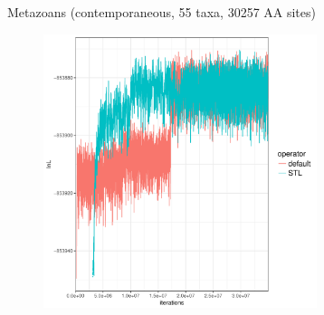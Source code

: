 \documentclass[newPxFont,numfooter,sectionpages]{beamer}
\begin{document}
\begin{frame}{Metazoans (contemporaneous, 55 taxa, 30257 AA sites)}
\begin{figure}
	\includegraphics[width=\textwidth,height=8cm]{figures/comparison_metazoan.pdf} 
\end{figure}
\end{frame}
%
%
% 
% 
% 
% 
\end{document}

